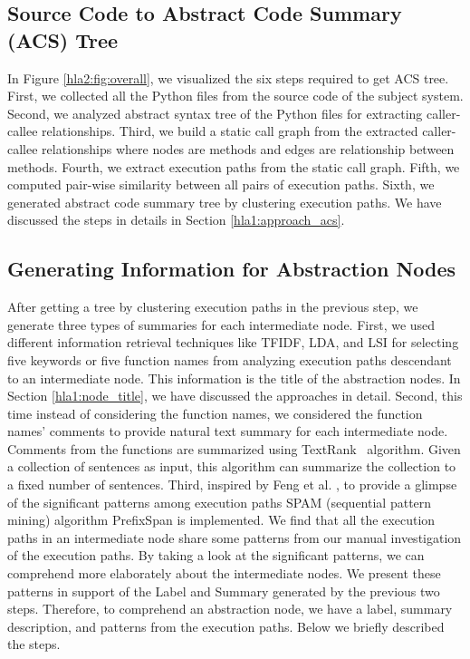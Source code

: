\subsection{Source Code to Abstract Code Summary (ACS) Tree}
\label{hla2:six_step}
In Figure \ref{hla2:fig:overall}, we visualized the six steps required to get ACS tree. First, we collected all the Python files from the source code of the subject system. Second, we analyzed abstract syntax tree of the Python files for extracting caller-callee relationships. Third, we build a static call graph from the extracted caller-callee relationships where nodes are methods and edges are relationship between methods. Fourth, we extract execution paths from the static call graph. Fifth, we computed pair-wise similarity between all pairs of execution paths. Sixth, we generated abstract code summary tree by clustering execution paths. We have discussed the steps in details in Section \ref{hla1:approach_acs}.


\subsection{Generating Information for Abstraction Nodes}
\label{hla2:node_information}
After getting a tree by clustering execution paths in the previous step,  
we generate three types of summaries for each intermediate node. First, we used different information retrieval techniques like TFIDF, LDA, and LSI for selecting five keywords or five function names from analyzing execution paths descendant to an intermediate node. This information is the title of the abstraction nodes. In Section \ref{hla1:node_title}, we have discussed the approaches in detail. Second, this time instead of considering the function names, we considered the function names' comments to provide natural text summary for each intermediate node. Comments from the functions are summarized using  TextRank~\cite{barrios2016variationsTextRankSummarization} algorithm. Given a collection of sentences as input, this algorithm can summarize the collection to a fixed number of sentences. Third, inspired by Feng et al. \cite{feng2018hierarchicalExecutionComprehension}, to provide a glimpse of the significant patterns among execution paths SPAM (sequential pattern mining) algorithm PrefixSpan \cite{han2001prefixspanSequentialPatterns} is implemented. We find that all the execution paths in an intermediate node share some patterns from our manual investigation of the execution paths. By taking a look at the significant patterns, we can comprehend more elaborately about the intermediate nodes. We present these patterns in support of the Label and Summary generated by the previous two steps. Therefore, to comprehend an abstraction node, we have a label, summary description, and patterns from the execution paths. Below we briefly described the steps. 


